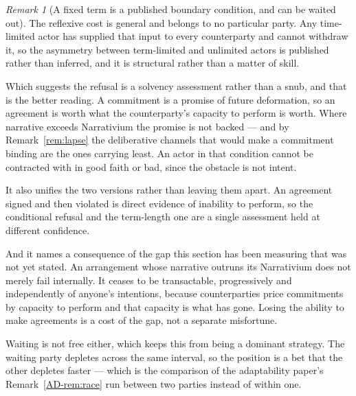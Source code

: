 \documentclass[11pt,a4paper]{article}
\theoremstyle{remark}
\newtheorem{remark}[definition]{Remark}
\begin{document}
\begin{remark}[A fixed term is a published boundary condition, and can be waited out]
The reflexive cost is general and belongs to no particular party. Any time-limited actor has
supplied that input to every counterparty and cannot withdraw it, so the asymmetry between
term-limited and unlimited actors is published rather than inferred, and it is structural rather than a
matter of skill.

Which suggests the refusal is a solvency assessment rather than a snub, and that is the better
reading. A commitment is a promise of future deformation, so an agreement is worth what the
counterparty's capacity to perform is worth. Where narrative exceeds Narrativium the promise is not
backed --- and by Remark~\ref{rem:lapse} the deliberative channels that would make a commitment binding
are the ones carrying least. An actor in that condition cannot be contracted with in good faith or
bad, since the obstacle is not intent.

It also unifies the two versions rather than leaving them apart. An agreement signed and then
violated is direct evidence of inability to perform, so the conditional refusal and the term-length one
are a single assessment held at different confidence.

And it names a consequence of the gap this section has been measuring that was not yet stated. An
arrangement whose narrative outruns its Narrativium does not merely fail internally. It ceases to
be transactable, progressively and independently of anyone's intentions, because counterparties price
commitments by capacity to perform and that capacity is what has gone. Losing the ability to make
agreements is a cost of the gap, not a separate misfortune.

Waiting is not free either, which keeps this from being a dominant strategy. The waiting party
depletes across the same interval, so the position is a bet that the other depletes faster --- which is
the comparison of the adaptability paper's Remark~\ref{AD-rem:race} run between two parties instead of within one.
\end{remark}
\end{document}
